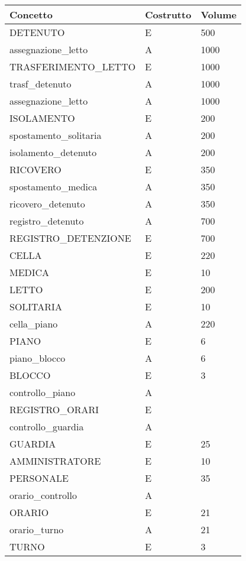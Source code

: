 \documentclass[a4paper,12pt]{report}
\begin{document}
\begin{table}[H]
\begin{tabular}{lll}
\hline
Concetto & Costrutto & Volume \\ \hline
DETENUTO & E & 500 \\
assegnazione\_letto & A &  1000 \\
TRASFERIMENTO\_LETTO & E &  1000 \\
trasf\_detenuto & A & 1000 \\
assegnazione\_letto & A & 1000\\
ISOLAMENTO & E & 200\\
spostamento\_solitaria & A & 200\\
isolamento\_detenuto & A & 200 \\
RICOVERO & E & 350 \\
spostamento\_medica & A & 350 \\
ricovero\_detenuto & A & 350 \\
registro\_detenuto & A & 700 \\
REGISTRO\_DETENZIONE & E & 700 \\
CELLA & E & 220 \\
MEDICA & E & 10\\
LETTO & E & 200 \\
SOLITARIA & E & 10 \\
cella\_piano & A & 220 \\
PIANO & E & 6 \\
piano\_blocco & A & 6 \\
BLOCCO & E & 3 \\
controllo\_piano & A & \\
REGISTRO\_ORARI & E & \\
controllo\_guardia & A & \\
GUARDIA & E & 25 \\
AMMINISTRATORE & E & 10 \\
PERSONALE & E & 35 \\
orario\_controllo & A & \\
ORARIO & E & 21 \\
orario\_turno & A & 21 \\
TURNO & E & 3 \\
\end{tabular}
\end{table}
\end{document}
